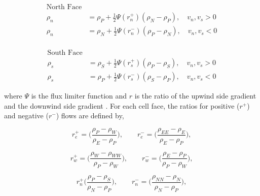 \vspace{-2cm}

\begin{equation}
\begin{split}
    \text{North Face} \\ 
    \rho_{n} &= \rho_{P} + \frac{1}{2}\Psi(r_{n}^{+})(\rho_{N} - \rho_{P}), \quad v_{n}, v_{s} > 0 \\
    \rho_{n} &= \rho_{N} +
    \frac{1}{2}\Psi(r_{n}^{-})(\rho_{P} - \rho_{N}), \quad v_{n}, v_{s} < 0 \\
    \label{eq:northFaceFlux}
\end{split}
\end{equation}

\vspace{-2cm}

\begin{equation}
\begin{split}
    \text{South Face} \\
    \rho_{s} &= \rho_{S} + \frac{1}{2}\Psi(r_{s}^{+})(\rho_{P} - \rho_{S}), \quad v_{n}, v_{s} > 0 \\
    \rho_{s} &= \rho_{P} + \frac{1}{2}\Psi(r_{s}^{-})(\rho_{S} - \rho_{P}), \quad v_{n}, v_{s} < 0 
    \label{eq:southFaceFlux}
\end{split}
\end{equation}

\noindent where $\Psi$ is the flux limiter function and $r$ is the ratio of the upwind side gradient and the downwind side gradient \cite{versteeg2007}. For each cell face, the ratios for positive ($r^{+}$) and negative ($r^{-}$) flows are defined by,

\begin{equation}
    r_{e}^{+} = \bigg( \frac{\rho_{P} - \rho_{W}}{\rho_{E} - \rho_{P}}\bigg), \quad \quad r_{e}^{-} = \bigg( \frac{\rho_{EE} - \rho_{E}}{\rho_{E} - \rho_{P}}\bigg),
\end{equation}

\begin{equation}
    r_{w}^{+} = \bigg( \frac{\rho_{W} - \rho_{WW}}{\rho_{P} - \rho_{W}}\bigg), \quad \quad r_{w}^{-} = \bigg( \frac{\rho_{E} - \rho_{P}}{\rho_{P} - \rho_{W}}\bigg),
\end{equation}

\begin{equation}
    r_{n}^{+} \bigg( \frac{\rho_{P} - \rho_{S}}{\rho_{N} - \rho_{P}} \bigg), \quad \quad r_{n}^{-} = \bigg( \frac{\rho_{NN} - \rho_{N}}{\rho_{N} - \rho_{P}} \bigg),
\end{equation}

